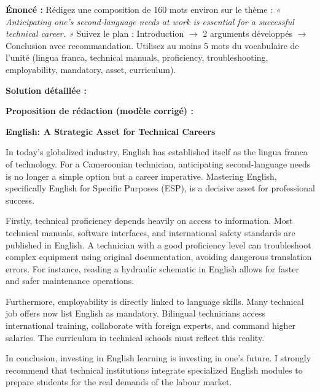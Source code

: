 \documentclass[11pt]{article}
\newcommand{\cle}[1]{{\popxbold\color{popdark}#1}}
\begin{document}
\begin{exoresolu}
\textbf{Énoncé :} Rédigez une composition de 160 mots environ sur le thème : \emph{« Anticipating one's second-language needs at work is essential for a successful technical career. »} Suivez le plan : Introduction $\rightarrow$ 2 arguments développés $\rightarrow$ Conclusion avec recommandation. Utilisez au moins 5 mots du vocabulaire de l'unité (\cle{lingua franca, technical manuals, proficiency, troubleshooting, employability, mandatory, asset, curriculum}).

\tcblower
\textbf{Solution détaillée :}

\textbf{Proposition de rédaction (modèle corrigé) :}

\textbf{English: A Strategic Asset for Technical Careers}

In today's globalized industry, English has established itself as the \cle{lingua franca} of technology. For a Cameroonian technician, anticipating second-language needs is no longer a simple option but a \cle{career imperative}. Mastering English, specifically \cle{English for Specific Purposes (ESP)}, is a decisive \cle{asset} for professional success.

\cle{Firstly}, technical proficiency depends heavily on access to information. Most \cle{technical manuals}, software interfaces, and international safety standards are published in English. A technician with a good \cle{proficiency} level can \cle{troubleshoot} complex equipment using original documentation, avoiding dangerous translation errors. \cle{For instance}, reading a hydraulic schematic in English allows for faster and safer maintenance operations.

\cle{Furthermore}, \cle{employability} is directly linked to language skills. Many technical job offers now list English as \cle{mandatory}. Bilingual technicians access international training, collaborate with foreign experts, and command higher salaries. The \cle{curriculum} in technical schools must reflect this reality.

\cle{In conclusion}, investing in English learning is investing in one's future. I strongly \cle{recommend} that technical institutions integrate specialized English modules to prepare students for the real demands of the labour market.


\end{exoresolu}
\end{document}
